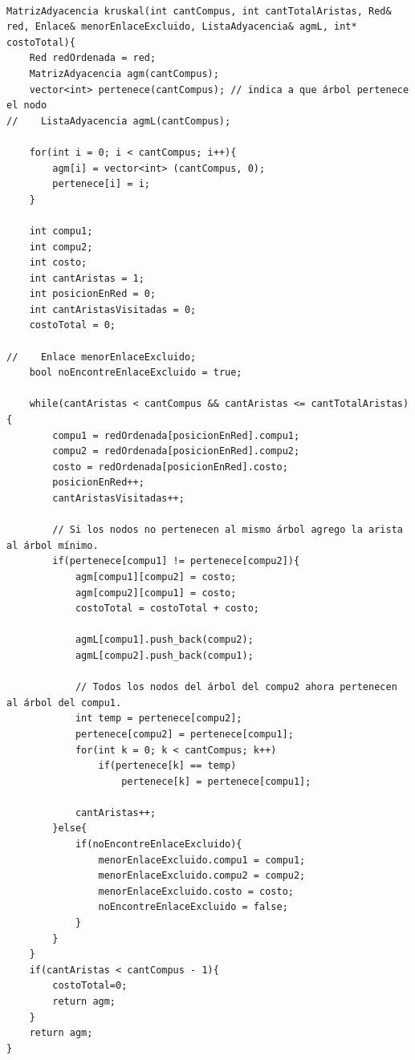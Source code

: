 \begin{lstlisting}

MatrizAdyacencia kruskal(int cantCompus, int cantTotalAristas, Red& red, Enlace& menorEnlaceExcluido, ListaAdyacencia& agmL, int* costoTotal){
    Red redOrdenada = red;
    MatrizAdyacencia agm(cantCompus);
    vector<int> pertenece(cantCompus); // indica a que árbol pertenece el nodo
//    ListaAdyacencia agmL(cantCompus);
 
    for(int i = 0; i < cantCompus; i++){
        agm[i] = vector<int> (cantCompus, 0);
        pertenece[i] = i;
    }
 
    int compu1;
    int compu2;
    int costo;
    int cantAristas = 1;
    int posicionEnRed = 0;
    int cantAristasVisitadas = 0;
    costoTotal = 0;

//    Enlace menorEnlaceExcluido;
    bool noEncontreEnlaceExcluido = true;

    while(cantAristas < cantCompus && cantAristas <= cantTotalAristas){
        compu1 = redOrdenada[posicionEnRed].compu1;
        compu2 = redOrdenada[posicionEnRed].compu2;
        costo = redOrdenada[posicionEnRed].costo;
        posicionEnRed++;
        cantAristasVisitadas++;

        // Si los nodos no pertenecen al mismo árbol agrego la arista al árbol mínimo.
        if(pertenece[compu1] != pertenece[compu2]){
            agm[compu1][compu2] = costo;
            agm[compu2][compu1] = costo;
            costoTotal = costoTotal + costo;

            agmL[compu1].push_back(compu2);
            agmL[compu2].push_back(compu1);
 
            // Todos los nodos del árbol del compu2 ahora pertenecen al árbol del compu1.
        	int temp = pertenece[compu2];
        	pertenece[compu2] = pertenece[compu1];
        	for(int k = 0; k < cantCompus; k++)
        		if(pertenece[k] == temp)
        			pertenece[k] = pertenece[compu1];
 
            cantAristas++;
        }else{
            if(noEncontreEnlaceExcluido){
                menorEnlaceExcluido.compu1 = compu1;
                menorEnlaceExcluido.compu2 = compu2;
                menorEnlaceExcluido.costo = costo;
                noEncontreEnlaceExcluido = false;
            }
        }
    }
    if(cantAristas < cantCompus - 1){
        costoTotal=0;
        return agm;
    }
    return agm;
}




\end{lstlisting}
